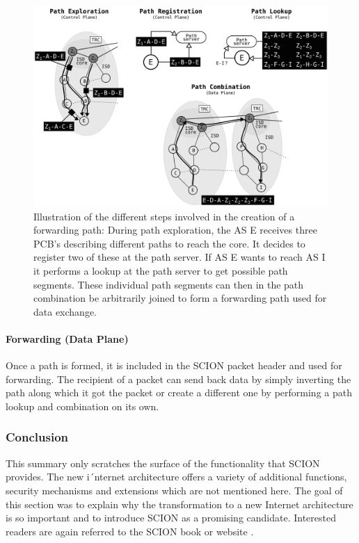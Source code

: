 \begin{figure}
	\begin{center}
		\def\svgwidth{1\textwidth}
		\includegraphics[scale=0.24]{../illustrations/importantConcepts/SCIONPathCreation.pdf} 
		\caption[Caption for the list of figures.]{Illustration of the different steps involved in the creation of a forwarding path: During path exploration, the AS E receives three PCB's describing different paths to reach the core. It decides to register two of these at the path server. If AS E wants to reach AS I it performs a lookup at the path server to get possible path segments. These individual path segments can then in the path combination be arbitrarily joined to form a forwarding path used for data exchange.}
		\label{fig:SCIONCreationForwardingPath}
	\end{center}
\end{figure}

\paragraph{Forwarding (Data Plane)}

Once a path is formed, it is included in the SCION packet header and used for forwarding. The recipient of a packet can send back data by simply inverting the path along which it got the packet or create a different one by performing a path lookup and combination on its own.

\subsubsection{Conclusion}

This summary only scratches the surface of the functionality that SCION provides. The new i´nternet architecture offers a variety of additional functions, security mechanisms and extensions which are not mentioned here. The goal of this section was to explain why the transformation to a new Internet architecture is so important and to introduce SCION as a promising candidate. Interested readers are again referred to the SCION book \cite{SCIONBook} or website \cite{SCIONWebMain}.